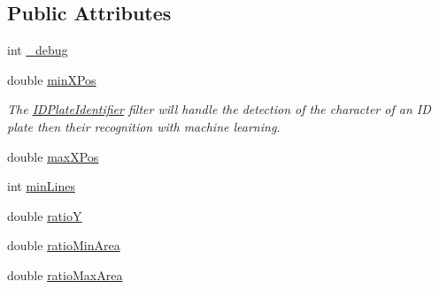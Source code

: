 \subsection*{Public Attributes}
\begin{DoxyCompactItemize}
\item 
int \hyperlink{classfilter_1_1_algos_1_1_i_d_plate_identifier_a77d38e1f10df45f9dc3ead39be484a27}{\+\_\+debug}
\item 
double \hyperlink{classfilter_1_1_algos_1_1_i_d_plate_identifier_ad2046fe20522a770d870f3acdfba95b6}{min\+X\+Pos}
\begin{DoxyCompactList}\small\item\em The \hyperlink{classfilter_1_1_algos_1_1_i_d_plate_identifier}{I\+D\+Plate\+Identifier} filter will handle the detection of the character of an ID plate then their recognition with machine learning. \end{DoxyCompactList}\item 
double \hyperlink{classfilter_1_1_algos_1_1_i_d_plate_identifier_a9915ef175c388d7078ff4e4d814dfadb}{max\+X\+Pos}
\item 
int \hyperlink{classfilter_1_1_algos_1_1_i_d_plate_identifier_a53b5e570450d77452422af3b47257d20}{min\+Lines}
\item 
double \hyperlink{classfilter_1_1_algos_1_1_i_d_plate_identifier_a46ee09888147ccaee5c647abe27ff7b0}{ratioY}
\item 
double \hyperlink{classfilter_1_1_algos_1_1_i_d_plate_identifier_a62e090f551fa2e5790a21a1235c13c8c}{ratio\+Min\+Area}
\item 
double \hyperlink{classfilter_1_1_algos_1_1_i_d_plate_identifier_a333762120ac6f91964ab75a80f0fba70}{ratio\+Max\+Area}
\end{DoxyCompactItemize}
